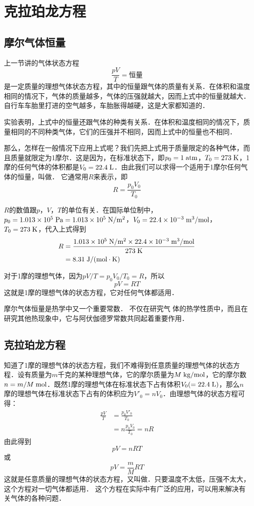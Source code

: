 \section{克拉珀龙方程}
\subsection{摩尔气体恒量} 

上一节讲的气体状态方程
\[\frac{pV}{T}=\text{恒量} \]
是一定质量的理想气体状态方程，其中的恒量跟气体的质量有关系．在体积和温度相同的情况下，气体的质量越多，气体的压强就越大，因而上式中的恒量就越大．自行车车胎里打进的空气越多，车胎胀得越硬，这是大家都知道的．

实验表明，上式中的恒量还跟气体的种类有关系．在体积和温度相同的情况下，质量相同的不同种类气体，它们的压强并不相同，因而上式中的恒量也不相同．

那么，怎样在一般情况下应用上式呢？我们先把上式用于质量限定的各种气体，而且质量就限定为1摩尔．这是因为，在标准状态下，即$p_0=1\;\text{atm}$，$T_0=273 \;\text{K} $，1摩的任何气体的体积都是$V_0=22.4\;\text{L}$．由此我们可以求得一个适用于1摩尔任何气体的恒量，叫做．
它通常用$R$来表示，即
\[R=\frac{p_0V_0}{T_0} \]

$R$的数值跟$p $，$ V $，$ T$的单位有关．在国际单位制中，$p_0=
1.013\times 10^5 \;\text{Pa}=1.013\times 10^5 \;\text{N}/\text{m}^2$，$V_0=22. 4\times 10^{-3} \;\text{m}^3/\text{mol}$，$T_0=273 \;\text{K} $，代入上式得到
\[\begin{split}
R&=\frac{1.013\times 10^5 \;\text{N}/\text{m}^2 \times  22. 4\times 10^{-3} \;\text{m}^3/\text{mol}}{273\;\text{K} }\\
&=8.31 \;\text{J}/(\text{mol}\cdot\text{K}) 
\end{split} \]

对于1摩的理想气体，因为$pV/T=p_0V_0/T_0=R$，所以
$$pV=RT$$
这就是1摩的理想气体的状态方程，它对任何气体都适用．

摩尔气体恒量是热学中又一个重要常数．
不仅在研究气
体的热学性质中，而且在研究其他热现象中，它与阿伏伽德罗常数共同起着重要作用．

\subsection{克拉珀龙方程} 

知道了1摩的理想气体的状态方程，我们不难得到任意质量的理想气体的状态方程．设有质量为$m$千克的某种理想气体，它的摩尔质量为$M \;\text{kg}/\text{mol} $，它的摩尔数$n=m/M \;\text{mol}$．既然1摩的理想气体在标准状态下占有体积$V_0(=22.4 \;\text{L} )$，那么$n$摩的理想气体在标准状态下占有的体积应为$V'_0=nV_0$．由理想气体的状态方程可得：
\[\begin{split}
\frac{pV}{T}&=\frac{p_0V'_0}{T_0}\\
&=n\frac{p_0V_0}{T_0}=nR
\end{split} \]
由此得到
\[pV=nRT \]
或\[pV=\frac{m}{M}RT \]
这就是任意质量的理想气体的状态方程，又叫做．只要温度不太低，压强不太大，这个方程对一切气体都适用．
这个方程在实际中有广泛的应用，可以用来解决有关气体的各种问题．

